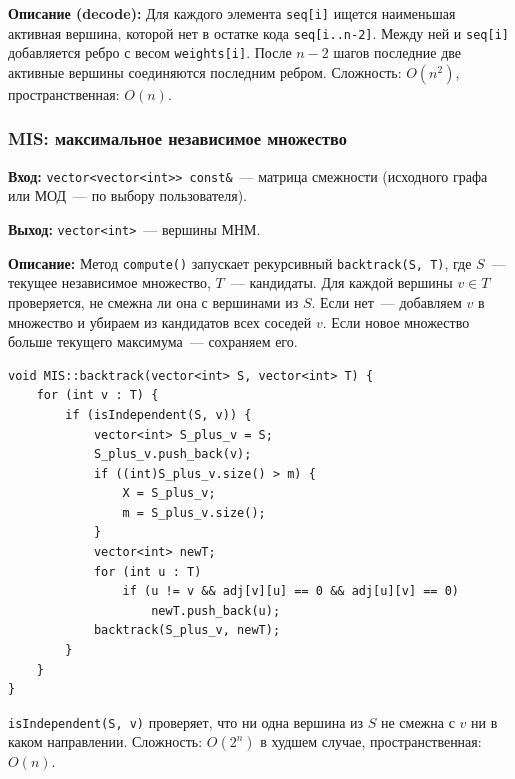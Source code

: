 \textbf{Описание (decode):} Для каждого элемента \texttt{seq[i]} ищется
наименьшая активная вершина, которой нет в остатке кода \texttt{seq[i..n-2]}.
Между ней и \texttt{seq[i]} добавляется ребро с весом \texttt{weights[i]}.
После $n - 2$ шагов последние две активные вершины соединяются последним ребром.
Сложность: $O(n^2)$, пространственная: $O(n)$.

\subsubsection{MIS: максимальное независимое множество}

\textbf{Вход:} \texttt{vector<vector<int>> const\&}~--- матрица смежности
(исходного графа или МОД~--- по выбору пользователя).

\textbf{Выход:} \texttt{vector<int>}~--- вершины МНМ.

\textbf{Описание:} Метод \texttt{compute()} запускает рекурсивный
\texttt{backtrack(S, T)}, где $S$~--- текущее независимое множество,
$T$~--- кандидаты. Для каждой вершины $v \in T$ проверяется, не смежна
ли она с вершинами из $S$. Если нет~--- добавляем $v$ в множество
и убираем из кандидатов всех соседей $v$. Если новое множество больше
текущего максимума~--- сохраняем его.

\begin{lstlisting}[style=cstyle, caption={Backtracking для нахождения MIS (mis.cpp)}]
void MIS::backtrack(vector<int> S, vector<int> T) {
    for (int v : T) {
        if (isIndependent(S, v)) {
            vector<int> S_plus_v = S;
            S_plus_v.push_back(v);
            if ((int)S_plus_v.size() > m) {
                X = S_plus_v;
                m = S_plus_v.size();
            }
            vector<int> newT;
            for (int u : T)
                if (u != v && adj[v][u] == 0 && adj[u][v] == 0)
                    newT.push_back(u);
            backtrack(S_plus_v, newT);
        }
    }
}
\end{lstlisting}

\texttt{isIndependent(S, v)} проверяет, что ни одна вершина из $S$
не смежна с $v$ ни в каком направлении.
Сложность: $O(2^n)$ в худшем случае, пространственная: $O(n)$.
